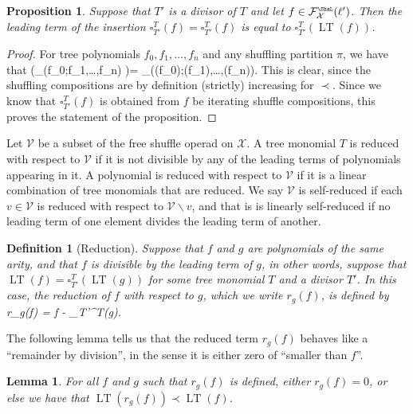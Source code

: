 \documentclass[fleqn, a4paper, twoside]{article}
\makeatletter
\newcommand{\lead}[1]{\operatorname{LT}(#1)}
\newcommand{\repl}[3]{\square_{#1}^{#2}(#3)}
\newcommand{\leadc}[1]{\operatorname{LC}(#1)}
\newcommand{\Sha}{{\scaleobj{0.75}{\ShaL}}}
\newcommand{\0}{\langle 0\rangle}
\newcommand{\XX}{\mathcal{X}}
\newcommand{\FF}{\mathcal{F}}
\let\[\@undefined
\DeclareRobustCommand{\[}{\begin{equation}}%
\let\]\@undefined
\DeclareRobustCommand{\]}{\end{equation}}%
\theoremstyle{mytheorem}
\newtheorem{proposition}[theorem]{Proposition}
\newtheorem{lemma}[theorem]{Lemma}
\theoremstyle{introthm}
\theoremstyle{mydefinition}
\newtheorem{definition}[theorem]{Definition}
\theoremstyle{mydefinition2}
\theoremstyle{plain} %
\newcommand{\?}{\,?\,}
\theoremstyle{mytheorem}
\theoremstyle{plain} %
\makeatother
\begin{document}
		
\begin{proposition}\label{prop:repllead}
Suppose that $T'$ is a divisor of $T$ and let $f\in \FF_\XX^\Sha(\ell')$.
Then the leading term of the insertion $\repl{T'}{T}{f} = \square_{T'}^T(f)$
is equal to $\repl{T'}{T}{\lead{f}}$.
\end{proposition}

\begin{proof}
For tree polynomials $f_0,f_1,\ldots,
f_n$ and any shuffling partition $\pi$, we have that
\[ \lead{\gamma_\pi(f_0;f_1,\ldots,f_n) }= 
 		\gamma_\pi(\lead{f_0};\lead{f_1},\ldots,\lead{f_n}).
 		\]
This is clear, since the shuffling compositions are by definition
(strictly) increasing for $\prec$. Since we know that $\repl{T'}{T}{f}$
is obtained from $f$ be iterating shuffle compositions, this proves
the statement of the proposition. 
\end{proof}

Let $\mathcal{V}$ be a subset of the free shuffle operad on $\XX$. A
tree monomial $T$ is reduced with respect to $\mathcal{V}$ if it is
not divisible by any of the leading terms of polynomials appearing in it.
A polynomial is reduced with respect to $\mathcal V$ if it is a linear
combination of tree monomials that are reduced. We say $\mathcal V$
is self-reduced if each $v\in \mathcal V$ is reduced with respect to
$\mathcal V\smallsetminus v$, and that is is linearly self-reduced
if no leading term of one element divides the leading term of 
another. 

\begin{definition}[Reduction]\label{def:reduce}
Suppose that $f$ and $g$ are polynomials of the same arity, and
that $f$ is divisible by the leading term of $g$, in other words,
suppose that $\lead{f} = \repl{T'}{T}{\lead{g}}$ for some
tree monomial $T$ and a divisor $T'$. In this case,
the reduction of $f$ with respect to $g$, which we write
$r_g(f)$, is defined by
\[
r_g(f) = f - \frac{\leadc{f}}{\leadc{g}} \repl{T'}{T}{g}.
\]
\end{definition}

The following lemma tells us that the reduced term $r_g(f)$ 
behaves like a ``remainder by division'', in the sense it is
either zero of ``smaller than $f$''.

\begin{lemma}\label{lemma:smaller}
For all $f$ and $g$ such that $r_g(f)$ is defined, either
$r_g(f)= 0$, or else we have that $\lead{r_g(f)} \prec \lead{f}$.
\end{lemma}
\end{document}
